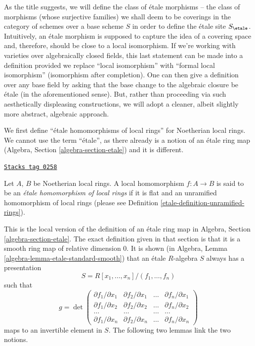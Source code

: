 \medskip\noindent
As the title suggests, we will define the class of \'etale morphisms -- the
class of morphisms (whose surjective families) we shall deem to be coverings
in the category of schemes over a base scheme $S$ in order to define the
\'etale site $S_\etale$. Intuitively, an \'etale morphism is supposed
to capture the idea of a covering space and, therefore, should be close to a
local isomorphism. If we're working with varieties over algebraically closed
fields, this last statement can be made into a definition provided we replace
``local isomorphism'' with ``formal local isomorphism'' (isomorphism after
completion). One can then give a definition over any base field by asking
that the base change to the algebraic closure be \'etale (in the
aforementioned sense). But, rather than proceeding via such aesthetically
displeasing constructions, we will adopt a cleaner, albeit slightly more
abstract, algebraic approach.

\medskip\noindent
We first define ``\'etale homomorphisms of local rings'' for Noetherian
local rings. We cannot use the term ``\'etale'', as there already
is a notion of an \'etale ring map
(Algebra, Section \ref{algebra-section-etale})
and it is different.

\begin{definition}
\label{etale-definition-etale-ring}
\href{https://stacks.math.columbia.edu/tag/0258}{\texttt{Stacks tag 0258}}

Let $A$, $B$ be Noetherian local rings.
A local homomorphism $f : A \to B$ is said to be an
{\it \'etale homomorphism of local rings}
if it is flat and an unramified homomorphism of local rings
(please see Definition \ref{etale-definition-unramified-rings}).
\end{definition}

This is the local version of the definition of an \'etale ring map in
Algebra, Section \ref{algebra-section-etale}.
The exact definition
given in that section is that it is a smooth ring map of relative
dimension $0$. It is shown (in
Algebra, Lemma \ref{algebra-lemma-etale-standard-smooth})
that an \'etale $R$-algebra $S$ always has a presentation
$$
S = R[x_1, \ldots, x_n]/(f_1, \ldots, f_n)
$$
such that
$$
g =
\det
\left(
\begin{matrix}
\partial f_1/\partial x_1 &
\partial f_2/\partial x_1 &
\ldots &
\partial f_n/\partial x_1 \\
\partial f_1/\partial x_2 &
\partial f_2/\partial x_2 &
\ldots &
\partial f_n/\partial x_2 \\
\ldots & \ldots & \ldots & \ldots \\
\partial f_1/\partial x_n &
\partial f_2/\partial x_n &
\ldots &
\partial f_n/\partial x_n
\end{matrix}
\right)
$$
maps to an invertible element in $S$. The following two lemmas link the two
notions.


